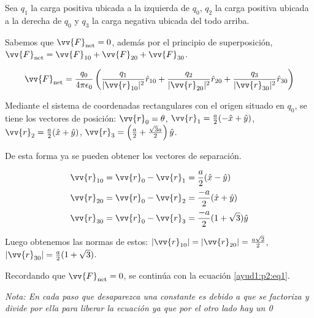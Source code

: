 \documentclass[11pt]{article}
\begin{document}
\begin{solucion}

    Sea $q_1$ la carga positiva ubicada a la izquierda de $q_0$, $q_2$ la carga positiva ubicada a la derecha de $q_0$ y $q_3$ la carga negativa ubicada del todo arriba.

    Sabemos que $\vv{F}_\text{net} = 0$, además por el principio de superposición, $\vv{F}_\text{net} = \vv{F}_{10} + \vv{F}_{20} + \vv{F}_{30}$.

    \begin{equation}\label{ayud1:p2:eq1}
        \vv{F}_\text{net} = \frac{q_0}{4\pi\epsilon_0}\left(\frac{q_1}{|\vv{r}_{10}|^2}\hat{r}_{10} + \frac{q_2}{|\vv{r}_{20}|^2}\hat{r}_{20}+ \frac{q_3}{|\vv{r}_{30}|^2}\hat{r}_{30} \right)
    \end{equation}

    Mediante el sistema de coordenadas rectangulares con el origen situado en $q_0$, se tiene los vectores de posición: $\vv{r}_0 = \theta$, $\vv{r}_1 = \frac{a}{2}(-\hat{x}+\hat{y})$, $\vv{r}_2 = \frac{a}{2}(\hat{x}+\hat{y})$, $\vv{r}_3 = \left(\frac{a}{2} + \frac{\sqrt{3}a}{2}\right)\hat{y}$.

    De esta forma ya se pueden obtener los vectores de separación.

    \begin{align}
        \vv{r}_{10} & = \vv{r}_0 - \vv{r}_1 = \frac{a}{2}(\hat{x}-\hat{y})    \\
        \vv{r}_{20} & = \vv{r}_0 - \vv{r}_2 = \frac{-a}{2}(\hat{x}+\hat{y})   \\
        \vv{r}_{30} & = \vv{r}_0 - \vv{r}_3 = \frac{-a}{2}(1+\sqrt{3})\hat{y}
    \end{align}

    Luego obtenemos las normas de estos: $|\vv{r}_{10}| = |\vv{r}_{20}| = \frac{a\sqrt{2}}{2}$, $|\vv{r}_{30}| = \frac{a}{2}(1+\sqrt{3})$.

    Recordando que $\vv{F}_\text{net} = 0$, se continúa con la ecuación \ref{ayud1:p2:eq1}.

    \textit{Nota: En cada paso que desaparezca una constante es debido a que se factoriza y divide por ella para liberar la ecuación ya que por el otro lado hay un 0}


\end{solucion}
\end{document}
